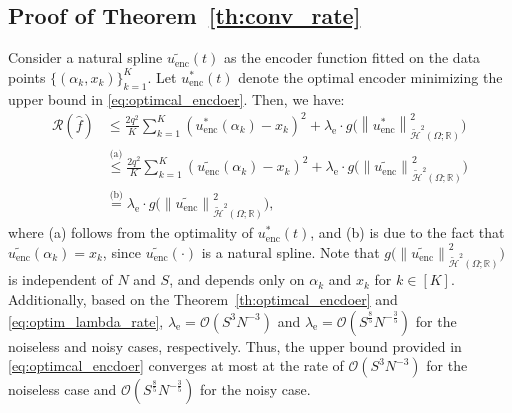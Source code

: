 \documentclass{article}
\def\encs{u_\textrm{enc}}
\def\enclamb{\lambda_\textrm{e}}
\newcommand{\norm}[1]{\left\lVert#1\right\rVert}
\newcommand{\hiltilde}[1]{\widetilde{\mathcal{H}}^{#1}\left(\Omega;\mathbb{R}\right)}
\newcommand{\lec}[2]{\stackrel{\text{#1}}{#2}}
\begin{document}
\subsection{Proof of Theorem~\ref{th:conv_rate}}\label{app:proof_convrate}
Consider a natural spline $\widetilde{\encs}(t)$ as the encoder function fitted on the data points $\{(\alpha_k, x_k)\}^K_{k=1}$. Let $\encs^*(t)$ denote the optimal encoder minimizing the upper bound in \eqref{eq:optimcal_encdoer}. Then, we have:
\begin{align}
    \mathcal{R}(\hat{f}) &\lec{}{\leqslant} \frac{2q^2}{K} \sum^K_{k=1} (\encs^*(\alpha_k) - x_k)^2 + \enclamb \cdot g\big(\norm{\encs^*}^2_{\hiltilde{2}}\big) \nonumber \\
    &\lec{(a)}{\leqslant} \frac{2q^2}{K} \sum^K_{k=1} (\widetilde{\encs}(\alpha_k) - x_k)^2 + \enclamb \cdot g\big(\norm{\widetilde{\encs}}^2_{\hiltilde{2}}\big) \nonumber \\
    &\lec{(b)}{=} \enclamb \cdot g\big(\norm{\widetilde{\encs}}^2_{\hiltilde{2}}\big),
\end{align}
where (a) follows from the optimality of $\encs^*(t)$, and (b) is due to the fact that $\widetilde{\encs}(\alpha_k) = x_k$, since $\widetilde{\encs}(\cdot)$ is a natural spline. Note that $g\big(\norm{\widetilde{\encs}}^2_{\hiltilde{2}}\big)$ is independent of $N$ and $S$, and depends only on $\alpha_k$ and $x_k$ for $k \in [K]$. Additionally, based on the Theorem~\ref{th:optimcal_encdoer} and \eqref{eq:optim_lambda_rate}, $\enclamb = \mathcal{O}(S^3N^{-3})$ and $\enclamb = \mathcal{O}(S^\frac{8}{5}N^{-\frac{3}{5}})$ for the noiseless and noisy cases, respectively. Thus, the upper bound provided in \eqref{eq:optimcal_encdoer} converges at most at the rate of $\mathcal{O}(S^3N^{-3})$ for the noiseless case and $\mathcal{O}(S^\frac{8}{5}N^{-\frac{3}{5}})$ for the noisy case.
\end{document}
